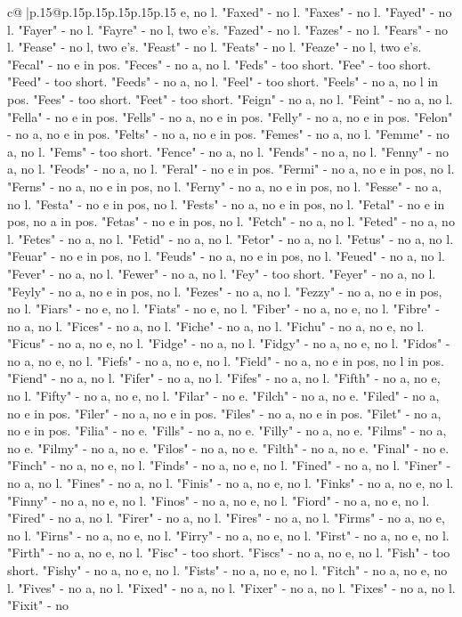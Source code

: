 \documentclass{article}
\begin{document}
{\begin{supertabular}{c@{$\;$}|p{.15\linewidth}@{}p{.15\linewidth}p{.15\linewidth}p{.15\linewidth}p{.15\linewidth}p{.15\linewidth}}
{{{e, no l. "Faxed" {-} no l. "Faxes" {-} no l. "Fayed" {-} no l. "Fayer" {-} no l. "Fayre" {-} no l, two e's. "Fazed" {-} no l. "Fazes" {-} no l. "Fears" {-} no l. "Fease" {-} no l, two e's. "Feast" {-} no l. "Feats" {-} no l. "Feaze" {-} no l, two e's. "Fecal" {-} no e in pos. "Feces" {-} no a, no l. "Feds" {-} too short. "Fee" {-} too short. "Feed" {-} too short. "Feeds" {-} no a, no l. "Feel" {-} too short. "Feels" {-} no a, no l in pos. "Fees" {-} too short. "Feet" {-} too short. "Feign" {-} no a, no l. "Feint" {-} no a, no l. "Fella" {-} no e in pos. "Fells" {-} no a, no e in pos. "Felly" {-} no a, no e in pos. "Felon" {-} no a, no e in pos. "Felts" {-} no a, no e in pos. "Femes" {-} no a, no l. "Femme" {-} no a, no l. "Fems" {-} too short. "Fence" {-} no a, no l. "Fends" {-} no a, no l. "Fenny" {-} no a, no l. "Feods" {-} no a, no l. "Feral" {-} no e in pos. "Fermi" {-} no a, no e in pos, no l. "Ferns" {-} no a, no e in pos, no l. "Ferny" {-} no a, no e in pos, no l. "Fesse" {-} no a, no l. "Festa" {-} no e in pos, no l. "Fests" {-} no a, no e in pos, no l. "Fetal" {-} no e in pos, no a in pos. "Fetas" {-} no e in pos, no l. "Fetch" {-} no a, no l. "Feted" {-} no a, no l. "Fetes" {-} no a, no l. "Fetid" {-} no a, no l. "Fetor" {-} no a, no l. "Fetus" {-} no a, no l. "Feuar" {-} no e in pos, no l. "Feuds" {-} no a, no e in pos, no l. "Feued" {-} no a, no l. "Fever" {-} no a, no l. "Fewer" {-} no a, no l. "Fey" {-} too short. "Feyer" {-} no a, no l. "Feyly" {-} no a, no e in pos, no l. "Fezes" {-} no a, no l. "Fezzy" {-} no a, no e in pos, no l. "Fiars" {-} no e, no l. "Fiats" {-} no e, no l. "Fiber" {-} no a, no e, no l. "Fibre" {-} no a, no l. "Fices" {-} no a, no l. "Fiche" {-} no a, no l. "Fichu" {-} no a, no e, no l. "Ficus" {-} no a, no e, no l. "Fidge" {-} no a, no l. "Fidgy" {-} no a, no e, no l. "Fidos" {-} no a, no e, no l. "Fiefs" {-} no a, no e, no l. "Field" {-} no a, no e in pos, no l in pos. "Fiend" {-} no a, no l. "Fifer" {-} no a, no l. "Fifes" {-} no a, no l. "Fifth" {-} no a, no e, no l. "Fifty" {-} no a, no e, no l. "Filar" {-} no e. "Filch" {-} no a, no e. "Filed" {-} no a, no e in pos. "Filer" {-} no a, no e in pos. "Files" {-} no a, no e in pos. "Filet" {-} no a, no e in pos. "Filia" {-} no e. "Fills" {-} no a, no e. "Filly" {-} no a, no e. "Films" {-} no a, no e. "Filmy" {-} no a, no e. "Filos" {-} no a, no e. "Filth" {-} no a, no e. "Final" {-} no e. "Finch" {-} no a, no e, no l. "Finds" {-} no a, no e, no l. "Fined" {-} no a, no l. "Finer" {-} no a, no l. "Fines" {-} no a, no l. "Finis" {-} no a, no e, no l. "Finks" {-} no a, no e, no l. "Finny" {-} no a, no e, no l. "Finos" {-} no a, no e, no l. "Fiord" {-} no a, no e, no l. "Fired" {-} no a, no l. "Firer" {-} no a, no l. "Fires" {-} no a, no l. "Firms" {-} no a, no e, no l. "Firns" {-} no a, no e, no l. "Firry" {-} no a, no e, no l. "First" {-} no a, no e, no l. "Firth" {-} no a, no e, no l. "Fisc" {-} too short. "Fiscs" {-} no a, no e, no l. "Fish" {-} too short. "Fishy" {-} no a, no e, no l. "Fists" {-} no a, no e, no l. "Fitch" {-} no a, no e, no l. "Fives" {-} no a, no l. "Fixed" {-} no a, no l. "Fixer" {-} no a, no l. "Fixes" {-} no a, no l. "Fixit" {-} no }}}
\end{supertabular}}
\end{document}
